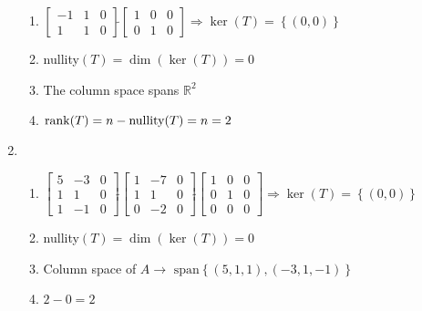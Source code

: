 \documentclass[12pt]{article}
\begin{document}
\begin{enumerate}
\begin{enumerate}
      \item $\left[ \begin{array}{cc|c} -1 & 1 & 0\\ 1 & 1 & 0\end{array} \right]\widetilde{ }\left[ \begin{array}{cc|c} 1 & 0 & 0\\ 0 & 1 & 0 \end{array}  \right]\Rightarrow \ker(T)=\left\{ (0,0) \right\}$

      \item nullity$(T)=\dim(\ker(T))=0$

      \item The column space spans $\mathbb{R}^2$

      \item $\rank(T)=n-\text{nullity}(T)=n=2$

    \end{enumerate}

    \setcounter{enumi}{20}

  \item

    \begin{enumerate}

      \item $\left[\begin{array}{cc|c} 5 & -3 & 0\\ 1 & 1 & 0\\ 1 & -1 & 0\end{array}\right]\widetilde{ }\left[ \begin{array}{cc|c} 1 & -7 & 0\\ 1 & 1 & 0\\ 0 & -2 & 0  \end{array} \right]\widetilde{ }\left[ \begin{array}{cc|c} 1 & 0 & 0\\ 0 & 1 & 0\\ 0 & 0 & 0\end{array} \right]\Rightarrow\ker(T)=\left\{ (0,0) \right\}$

      \item nullity$(T)=\dim(\ker(T))=0$

      \item Column space of $A\rightarrow$ $\text{span}\left\{ (5,1,1),(-3,1,-1) \right\}$

      \item $2-0=2$

    \end{enumerate}


\end{enumerate}
\end{document}
